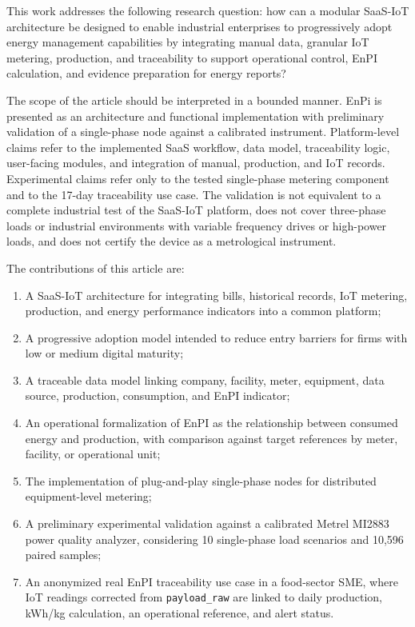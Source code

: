 \documentclass{ieeeaccess}
\begin{document}
This work addresses the following research question: how can a modular SaaS-IoT architecture be designed to enable industrial enterprises to progressively adopt energy management capabilities by integrating manual data, granular IoT metering, production, and traceability to support operational control, EnPI calculation, and evidence preparation for energy reports?

The scope of the article should be interpreted in a bounded manner. EnPi is presented as an architecture and functional implementation with preliminary validation of a single-phase node against a calibrated instrument. Platform-level claims refer to the implemented SaaS workflow, data model, traceability logic, user-facing modules, and integration of manual, production, and IoT records. Experimental claims refer only to the tested single-phase metering component and to the 17-day traceability use case. The validation is not equivalent to a complete industrial test of the SaaS-IoT platform, does not cover three-phase loads or industrial environments with variable frequency drives or high-power loads, and does not certify the device as a metrological instrument.

The contributions of this article are:
\begin{enumerate}
\item A SaaS-IoT architecture for integrating bills, historical records, IoT metering, production, and energy performance indicators into a common platform;
\item A progressive adoption model intended to reduce entry barriers for firms with low or medium digital maturity;
\item A traceable data model linking company, facility, meter, equipment, data source, production, consumption, and EnPI indicator;
\item An operational formalization of EnPI as the relationship between consumed energy and production, with comparison against target references by meter, facility, or operational unit;
\item The implementation of plug-and-play single-phase nodes for distributed equipment-level metering;
\item A preliminary experimental validation against a calibrated Metrel MI2883 power quality analyzer, considering 10 single-phase load scenarios and 10,596 paired samples;
\item An anonymized real EnPI traceability use case in a food-sector SME, where IoT readings corrected from \texttt{payload\_raw} are linked to daily production, kWh/kg calculation, an operational reference, and alert status.
\end{enumerate}
\end{document}
